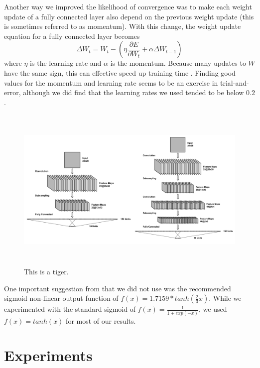 \documentclass[10pt,twocolumn,letterpaper]{article}
\begin{document}
Another way we improved the likelihood of convergence was to make each weight update of a
fully connected layer also depend on the previous weight update (this is sometimes
referred to as momentum). With this change, the weight update equation for a fully connected
layer becomes
$$\Delta W_{t} = W_{t} - (\eta \frac{\partial E}{\partial W_{t}} +
\alpha \Delta W_{t-1})$$
where $\eta$ is the learning rate and $\alpha$ is the momentum.
Because many updates to $W$ have the same sign, this can effective speed up training time
\cite{WinMomentum}.
Finding good values for the momentum and learning rate seems to be
an exercise in trial-and-error, although we did find that
the learning rates we used tended to be below $0.2$.

\begin{figure}
  \includegraphics[width=\textwidth,height=8cm]{botharcs}
  \caption{This is a tiger.}
  \label{fig:convarcs}
\end{figure}

One important suggestion from \cite{EfficientBackProp} that we did not use was the
recommended sigmoid non-linear output function of $f(x) = 1.7159 * tanh(\frac{2}{3}x)$.
While we experimented with the standard sigmoid of $f(x) = \frac{1}{1 + exp(-x)}$,
we used $f(x) = tanh(x)$ for most of our results.

\section{Experiments}
\end{document}
